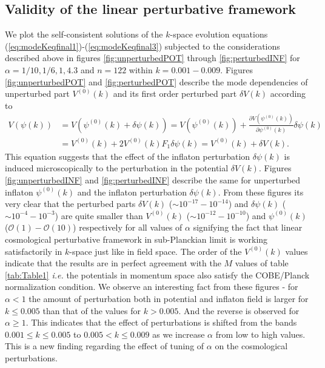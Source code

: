 \documentclass[a4paper,11pt]{article}
\begin{document}
\subsection{Validity of the linear perturbative framework}
\label{subsec:Validity}
We plot the self-consistent solutions of the $k$-space evolution equations (\ref{eq:modeKeqfinal1})-(\ref{eq:modeKeqfinal3}) subjected to the considerations described above in figures \ref{fig:unperturbedPOT} through \ref{fig:perturbedINF} for $\alpha=1/10, 1/6, 1, 4.3$ and $n=122$ within $k=0.001 - 0.009$. Figures \ref{fig:unperturbedPOT} and \ref{fig:perturbedPOT} describe the mode dependencies of unperturbed part $V^{(0)}(k)$ and its first order perturbed part $\delta V(k)$ according to
    \begin{equation}
    \begin{split}
        V(\psi(k))&=V(\psi^{(0)}(k)+\delta\psi(k))=V(\psi^{(0)}(k))+\frac{\partial V(\psi^{(0)}(k))}{\partial \psi^{(0)}(k)}\delta\psi(k)\\
        &=V^{(0)}(k)+2V^{(0)}(k)F_1\delta\psi(k)=V^{(0)}(k)+\delta V(k).
    \end{split}
    \label{eq:modeINFpot}
    \end{equation}
    This equation suggests that the effect of the inflaton perturbation $\delta\psi (k)$ is induced microscopically to the perturbation in the potential $\delta V(k)$.
    Figures \ref{fig:unperturbedINF} and \ref{fig:perturbedINF} describe the same for unperturbed inflaton $\psi^{(0)}(k)$ and the inflaton perturbation $\delta\psi(k)$. From these figures its very clear that the perturbed parts $\delta V(k)$ ($\sim 10^{-17} - 10^{-14}$) and $\delta\psi (k)$ ($\sim 10^{-4} - 10^{-3}$) are quite smaller than $V^{(0)}(k)$ ($\sim 10^{-12} - 10^{-10}$) and $\psi^{(0)}(k)$ ($\mathcal{O}(1) - \mathcal{O}(10)$) respectively for all values of $\alpha$ signifying the fact that linear cosmological perturbative framework in sub-Planckian limit is working satisfactorily in $k$-space just like in field space. The order of the $V^{(0)}(k)$ values indicate that the results are in perfect agreement with the $M$ values of table \ref{tab:Table1} \textit{i.e.} the potentials in momentum space also satisfy the COBE/Planck normalization condition. We observe an interesting fact from these figures - for $\alpha< 1$ the amount of perturbation both in potential and inflaton field is larger for $k\leq 0.005$ than that of the values for $k>0.005$. And the reverse is observed for $\alpha\geq 1$. This indicates that the effect of perturbations is shifted from the bands $0.001\leq k \leq 0.005$ to $0.005< k \leq 0.009$ as we increase $\alpha$ from low to high values. This is a new finding regarding the effect of tuning of $\alpha$ on the cosmological perturbations.
\end{document}

